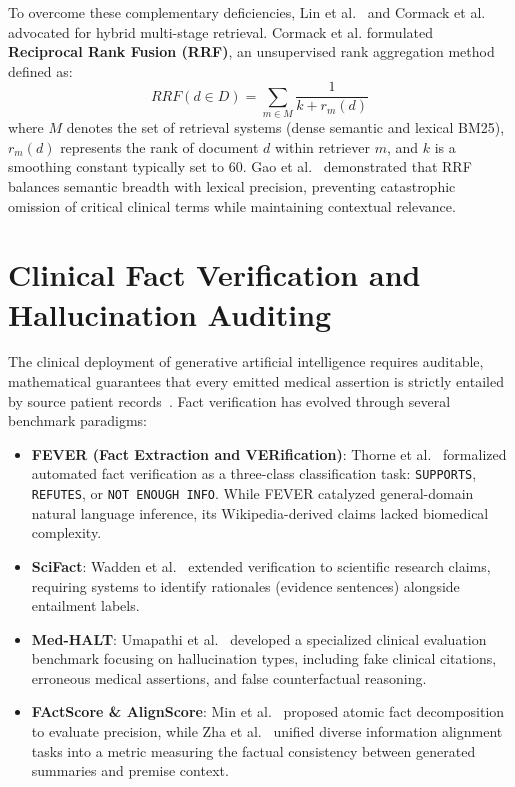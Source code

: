 To overcome these complementary deficiencies, Lin et al.~\cite{lin2023hybrid} and Cormack et al.~\cite{cormack2009rrf} advocated for hybrid multi-stage retrieval. Cormack et al. formulated \textbf{Reciprocal Rank Fusion (RRF)}, an unsupervised rank aggregation method defined as:
\begin{equation}
    RRF(d \in D) = \sum_{m \in M} \frac{1}{k + r_m(d)}
\end{equation}
where $M$ denotes the set of retrieval systems (dense semantic and lexical BM25), $r_m(d)$ represents the rank of document $d$ within retriever $m$, and $k$ is a smoothing constant typically set to $60$. Gao et al.~\cite{gao2023rag_survey} demonstrated that RRF balances semantic breadth with lexical precision, preventing catastrophic omission of critical clinical terms while maintaining contextual relevance.


\section{Clinical Fact Verification and Hallucination Auditing}
\label{sec:lit_verification}

The clinical deployment of generative artificial intelligence requires auditable, mathematical guarantees that every emitted medical assertion is strictly entailed by source patient records~\cite{ji2023hallucination}. Fact verification has evolved through several benchmark paradigms:
\begin{itemize}
    \item \textbf{FEVER (Fact Extraction and VERification)}: Thorne et al.~\cite{thorne2018fever} formalized automated fact verification as a three-class classification task: \texttt{SUPPORTS}, \texttt{REFUTES}, or \texttt{NOT ENOUGH INFO}. While FEVER catalyzed general-domain natural language inference, its Wikipedia-derived claims lacked biomedical complexity.
    \item \textbf{SciFact}: Wadden et al.~\cite{wadden2020scifact} extended verification to scientific research claims, requiring systems to identify rationales (evidence sentences) alongside entailment labels.
    \item \textbf{Med-HALT}: Umapathi et al.~\cite{umapathi2023medhalt} developed a specialized clinical evaluation benchmark focusing on hallucination types, including fake clinical citations, erroneous medical assertions, and false counterfactual reasoning.
    \item \textbf{FActScore \& AlignScore}: Min et al.~\cite{min2023factscore} proposed atomic fact decomposition to evaluate precision, while Zha et al.~\cite{zha2023alignscore} unified diverse information alignment tasks into a metric measuring the factual consistency between generated summaries and premise context.
\end{itemize}

